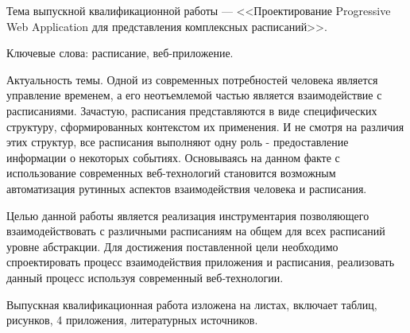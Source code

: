 
Тема выпускной квалификационной работы --- <<Проектирование Progressive Web Application для представления комплексных расписаний>>.

Ключевые слова: расписание, веб-приложение.

Актуальность темы.
Одной из современных потребностей человека является управление временем, а его неотъемлемой частью является взаимодействие с расписаниями.
Зачастую, расписания представляются в виде специфических структуру, сформированных контекстом их применения.
И не смотря на различия этих структур, все расписания выполняют одну роль - предоставление информации о некоторых событиях.
Основываясь на данном факте с использование современных веб-технологий становится возможным автоматизация рутинных аспектов взаимодействия человека и расписания.

Целью данной работы является реализация инструментария позволяющего взаимодействовать с различными расписаниям на общем для всех расписаний уровне абстракции.
Для достижения поставленной цели необходимо спроектировать процесс взаимодействия приложения и расписания, реализовать данный процесс используя современный веб-технологии.

Выпускная квалификационная работа изложена на \pageref{LastPage} листах, включает  таблиц,  рисунков, 4 приложения,  литературных источников.

\clearpage